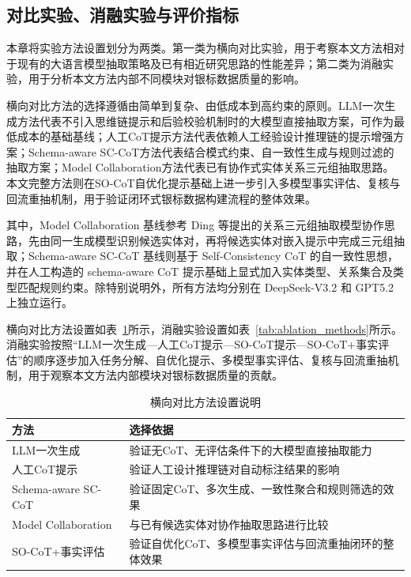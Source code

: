 \subsection{对比实验、消融实验与评价指标}

本章将实验方法设置划分为两类。第一类为横向对比实验，用于考察本文方法相对于现有的大语言模型抽取策略及已有相近研究思路的性能差异；第二类为消融实验，用于分析本文方法内部不同模块对银标数据质量的影响。

横向对比方法的选择遵循由简单到复杂、由低成本到高约束的原则。LLM一次生成方法代表不引入思维链提示和后验校验机制时的大模型直接抽取方案，可作为最低成本的基础基线；人工CoT提示方法代表依赖人工经验设计推理链的提示增强方案；Schema-aware SC-CoT方法代表结合模式约束、自一致性生成与规则过滤的抽取方案；Model Collaboration方法代表已有协作式实体关系三元组抽取思路。本文完整方法则在SO-CoT自优化提示基础上进一步引入多模型事实评估、复核与回流重抽机制，用于验证闭环式银标数据构建流程的整体效果。

其中，Model Collaboration 基线参考 Ding 等提出的关系三元组抽取模型协作思路\cite{Ding2024ModelCollaboration}，先由同一生成模型识别候选实体对，再将候选实体对嵌入提示中完成三元组抽取；Schema-aware SC-CoT 基线则基于 Self-Consistency CoT 的自一致性思想\cite{Wang2023SelfConsistency}，并在人工构造的 schema-aware CoT 提示基础上显式加入实体类型、关系集合及类型匹配规则约束。除特别说明外，所有方法均分别在 DeepSeek-V3.2 和 GPT5.2 上独立运行。

横向对比方法设置如表~\ref{tab:horizontal_comparison_methods}所示，消融实验设置如表~\ref{tab:ablation_methods}所示。消融实验按照“LLM一次生成—人工CoT提示—SO-CoT提示—SO-CoT+事实评估”的顺序逐步加入任务分解、自优化提示、多模型事实评估、复核与回流重抽机制，用于观察本文方法内部模块对银标数据质量的贡献。

\begin{table}[htbp]
  \centering
  \caption{横向对比方法设置说明}
  \label{tab:horizontal_comparison_methods}
  {
  \small
  \setlength{\tabcolsep}{4pt}
  \begin{tabularx}{0.96\textwidth}{
    >{\raggedright\arraybackslash}p{}
    >{\raggedright\arraybackslash}X
  }
    \toprule
    方法 & 选择依据 \\
    \midrule
    LLM一次生成
    & 验证无CoT、无评估条件下的大模型直接抽取能力 \\

    人工CoT提示
    & 验证人工设计推理链对自动标注结果的影响 \\

    Schema-aware SC-CoT
    & 验证固定CoT、多次生成、一致性聚合和规则筛选的效果 \\

    Model Collaboration
    & 与已有候选实体对协作抽取思路进行比较 \\

    SO-CoT+事实评估
    & 验证自优化CoT、多模型事实评估与回流重抽闭环的整体效果 \\
    \bottomrule
  \end{tabularx}}
\end{table}

